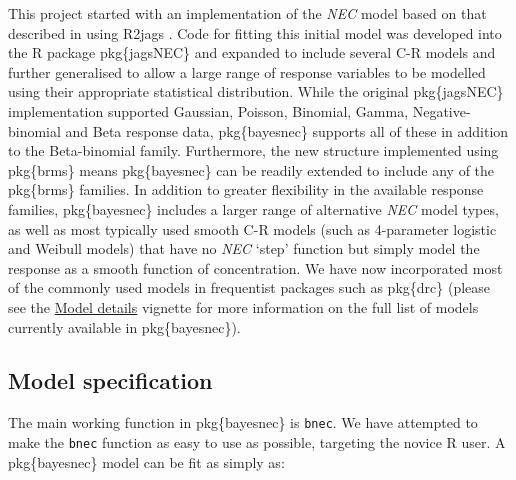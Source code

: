 \documentclass[
]{jss}
\begin{document}
This project started with an implementation of the \emph{NEC} model
based on that described in \citep{Fox2010, Pires2002} using R2jags
\citep{Su2015}. Code for fitting this initial model was developed into
the R package pkg\{jagsNEC\} and expanded to include several C-R models
and further generalised to allow a large range of response variables to
be modelled using their appropriate statistical distribution. While the
original pkg\{jagsNEC\} implementation supported Gaussian, Poisson,
Binomial, Gamma, Negative-binomial and Beta response data,
pkg\{bayesnec\} supports all of these in addition to the Beta-binomial
family. Furthermore, the new structure implemented using pkg\{brms\}
means pkg\{bayesnec\} can be readily extended to include any of the
pkg\{brms\} families. In addition to greater flexibility in the
available response families, pkg\{bayesnec\} includes a larger range of
alternative \emph{NEC} model types, as well as most typically used
smooth C-R models (such as 4-parameter logistic and Weibull models) that
have no \emph{NEC} `step' function but simply model the response as a
smooth function of concentration. We have now incorporated most of the
commonly used models in frequentist packages such as pkg\{drc\}
\citep{Ritz2016} (please see the
\href{https://open-aims.github.io/bayesnec/articles/example2b.html}{Model
details} vignette for more information on the full list of models
currently available in pkg\{bayesnec\}).

\hypertarget{model-specification}{%
\subsection{Model specification}\label{model-specification}}

The main working function in pkg\{bayesnec\} is \texttt{bnec}. We have
attempted to make the \texttt{bnec} function as easy to use as possible,
targeting the novice R user. A pkg\{bayesnec\} model can be fit as
simply as:
\end{document}
